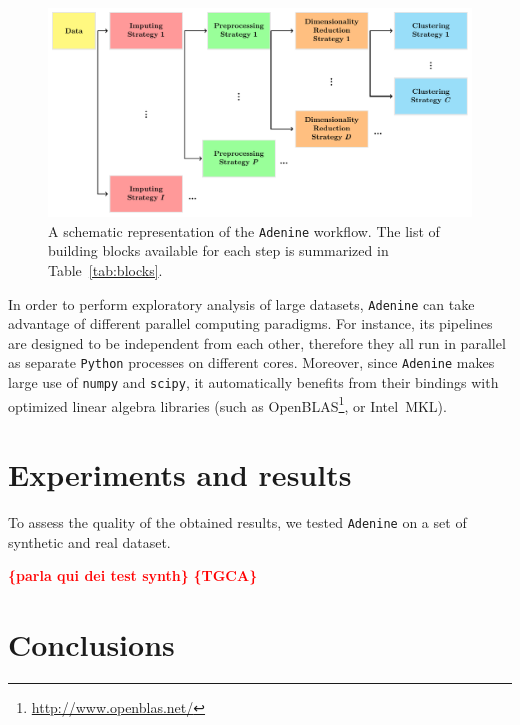 \documentclass[twoside,11pt]{article}
\makeatletter
\newcommand{\ade}{\texttt{Adenine}\@\xspace}
\newcommand{\py}{\texttt{Python}\@\xspace}
\newcommand{\todo}[1]{\textcolor{red}{{\bf \{#1\}}}} %
\makeatother
\begin{document}
\begin{figure}[h!]
    \centering
    \includegraphics[width=\textwidth]{ade_wf/ade_wf.pdf}
    \caption{A schematic representation of the \ade workflow. The list of building blocks available for each step is summarized in Table~\ref{tab:blocks}.}\label{fig:workflow}
\end{figure}


In order to perform exploratory analysis of large datasets, \ade can take advantage of different parallel computing paradigms. For instance, its pipelines are designed to be independent from each other, therefore they all run in parallel as separate \py processes on different cores. Moreover, since \ade makes large use of \texttt{numpy} and \texttt{scipy}, it automatically benefits from their bindings with optimized linear algebra libraries (such as OpenBLAS\footnote{\href{http://www.openblas.net/}{http://www.openblas.net/}}, or Intel\textsuperscript{\textregistered}~MKL).

\section{Experiments and results}
To assess the quality of the obtained results, we tested \ade on a set of synthetic and real dataset.

\todo{parla qui dei test synth}
\todo{TGCA}

\section{Conclusions}



\end{document}
